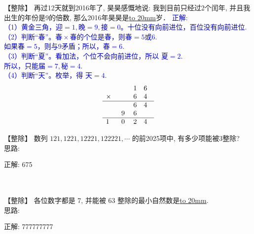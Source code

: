 
\item {
    【整除】
    再过12天就到2016年了, 昊昊感慨地说: 我到目前只经过2个闰年, 并且我出生的年份是9的倍数, 那么2016年昊昊是\underline{\hbox to 20mm{}}岁． 
    \ifshowSolution 
        \fangsong{}\textcolor{blue}{
            正解: \\
            （1）黄金三角，$迎=1,晚=9,接=0$。十位没有向前进位，百位没有向前进位. \\
            （2）判断``春''。$春\times 春$的个位是春，则$春=5或6$. \\
            如果$春=5$，则与9矛盾；所以，$春=6$.\\
            （3）判断``夏''。看加法，个位不会向前进位，所以 $夏=2$. \\
            所以，只能$届=7, 秘=4$. \\
            （4）判断``天''。枚举，得 $天=4$.
            \[
            \begin{array}{l@{\hspace{1em}}  c@{\hspace{1em}} c@{\hspace{1em}} c@{\hspace{1em}}}
                \quad & \quad & 1 & 6 \\
                \times &\quad & 6 & 4 \\ 
                \hline
                \quad &\quad & 6 & 4 \\ 
                \quad & 9 & 6 \\
                \hline
                1& 0 & 2 & 4 \\
            \end{array}
            \]
        }
    \else
        \vspace{1cm}
    \fi
}

\item {
    【整除】
    数列 $121, 1221, 12221, 122221,\cdots$ 的前2025项中, 有多少项能被3整除? 
    \ifshowSolution
        \fangsong{}
        \\
        思路:

        正解: 675
    \else
        \\ \\ \\
    \fi
}

\item {
    【整除】
    各位数字都是 7, 并能被 63 整除的最小自然数是\underline{\hbox to 20mm{}}.
    \ifshowSolution
        \fangsong{}
        \\
        思路:

        正解: 777777777
    \else
        \\ \\ \\
    \fi
}

